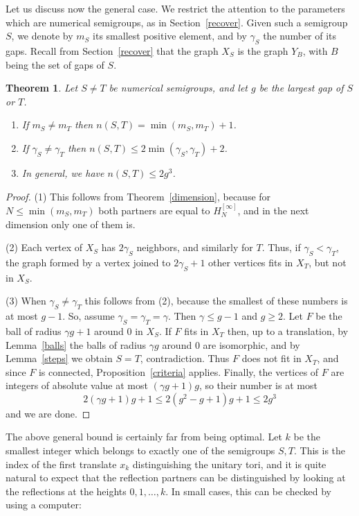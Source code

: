 \documentclass[11pt,a4paper]{article}
\newtheorem{thm}{Theorem}[section]
\begin{document}
Let us discuss now the general case. We restrict the attention to the parameters which are numerical semigroups, as in Section~\ref{recover}. Given such a semigroup $S$, we denote by $m_S$ its smallest positive element, and by $\gamma_S$ the number of its gaps. Recall from Section~\ref{recover} that the graph $X_S$ is the graph $Y_B$, with $B$ being the set of gaps of $S$.

\begin{thm}\label{separation-general}
Let $S\neq T$ be numerical semigroups, and let $g$ be the largest gap of $S$ or $T$.
\begin{enumerate}
\item If $m_S\neq m_T$ then $n(S,T)=\min(m_S,m_T)+1$.

\item If $\gamma_S\neq\gamma_T$ then $n(S,T)\leq2\min(\gamma_S,\gamma_T)+2$.

\item In general, we have $n(S,T)\leq2g^3$.
\end{enumerate}
\end{thm}

\begin{proof}
(1) This follows from Theorem~\ref{dimension}, because for $N\leq\min(m_S,m_T)$ both partners are equal to $H_N^{[\infty]}$, and in the next dimension only one of them is.

(2) Each vertex of $X_S$ has $2\gamma_S$ neighbors, and similarly for $T$. Thus, if $\gamma_S<\gamma_T$, the graph formed by a vertex joined to $2\gamma_S+1$ other vertices fits in $X_T$, but not in $X_S$.

(3) When $\gamma_S\neq\gamma_T$ this follows from (2), because the smallest of these numbers is at most $g-1$. So, assume $\gamma_S=\gamma_T=\gamma$. Then $\gamma\leq g-1$ and $g\geq2$. Let $F$ be the ball of radius $\gamma g+1$ around $0$ in $X_S$. If $F$ fits in $X_T$ then, up to a translation, by Lemma~\ref{balls} the balls of radius $\gamma g$ around $0$ are isomorphic, and by Lemma~\ref{steps} we obtain $S=T$, contradiction. Thus $F$ does not fit in $X_T$, and since $F$ is connected, Proposition~\ref{criteria} applies. Finally, the vertices of $F$ are integers of absolute value at most $(\gamma g+1)g$, so their number is at most
\[
 2(\gamma g+1)g+1\leq2(g^2-g+1)g+1\leq2g^3
\]
and we are done.
\end{proof}

The above general bound is certainly far from being optimal. Let $k$ be the smallest integer which belongs to exactly one of the semigroups $S,T$. This is the index of the first translate $x_k$ distinguishing the unitary tori, and it is quite natural to expect that the reflection partners can be distinguished by looking at the reflections at the heights $0,1,\ldots,k$. In small cases, this can be checked by using a computer:
\end{document}
